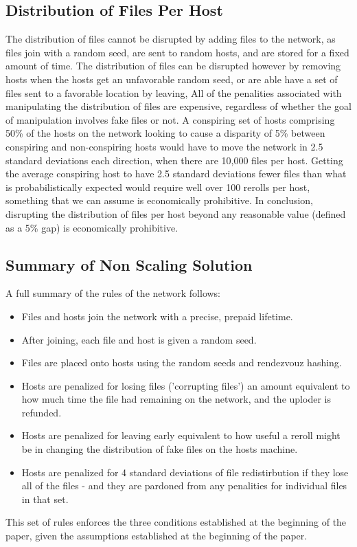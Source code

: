 \documentclass[twocolumn]{article}
\begin{document}
\subsection{Distribution of Files Per Host}
The distribution of files cannot be disrupted by adding files to the network, as files join with a random seed, are sent to random hosts, and are stored for a fixed amount of time.
The distribution of files can be disrupted however by removing hosts when the hosts get an unfavorable random seed, or are able have a set of files sent to a favorable location by leaving,
All of the penalities associated with manipulating the distribution of files are expensive, regardless of whether the goal of manipulation involves fake files or not.
A conspiring set of hosts comprising 50\% of the hosts on the network looking to cause a disparity of 5\% between conspiring and non-conspiring hosts would have to move the network in 2.5 standard deviations each direction, when there are 10,000 files per host.
Getting the average conspiring host to have 2.5 standard deviations fewer files than what is probabilistically expected would require well over 100 rerolls per host, something that we can assume is economically prohibitive.
In conclusion, disrupting the distribution of files per host beyond any reasonable value (defined as a 5\% gap) is economically prohibitive.

\subsection{Summary of Non Scaling Solution}
A full summary of the rules of the network follows:
\begin{itemize}
	\item Files and hosts join the network with a precise, prepaid lifetime.
	\item After joining, each file and host is given a random seed.
	\item Files are placed onto hosts using the random seeds and rendezvouz hashing.
	\item Hosts are penalized for losing files ('corrupting files') an amount equivalent to how much time the file had remaining on the network, and the uploder is refunded.
	\item Hosts are penalized for leaving early equivalent to how useful a reroll might be in changing the distribution of fake files on the hosts machine.
	\item Hosts are penalized for 4 standard deviations of file redistirbution if they lose all of the files - and they are pardoned from any penalities for individual files in that set.
\end{itemize}
This set of rules enforces the three conditions established at the beginning of the paper, given the assumptions established at the beginning of the paper.
\end{document}
